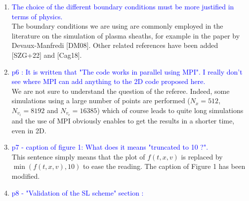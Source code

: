 \documentclass{article}
\begin{document}
\begin{enumerate}
    \item \textcolor{blue}{The choice of the different boundary conditions must be more justified in terms of physics. }\\
The boundary conditions we are using are commonly employed in the literature on the simulation of plasma sheaths, 
for example in the paper by Devaux-Manfredi [DM08]. Other related references have been added [SZG+22] and [Cag18].   \\%
    \item \textcolor{blue}{p6 : It is written that "The code works in parallel using MPI". I really don't see where MPI can add anything to the 2D code proposed here. }\\ 
    We are not sure to understand the question of the referee. Indeed, some simulations using a large number of points are performed 
    ($N_x=512$, $N_{v_i}=8192$ and $N_{v_e}=16385$) which of course leads to quite long simulations and the use of MPI obviously 
    enables to get the results in a shorter time, even in 2D. \\
    \item \textcolor{blue}{p7 - caption of figure 1: What does it means "truncated to 10 ?". }\\
    This sentence simply means that the plot of $f(t, x, v)$ is replaced by $\min(f(t, x, v), 10)$ to ease the reading. The caption of Figure 1 has been modified. \\
    \item \textcolor{blue}{p8 - "Validation of the SL scheme" section :}
\begin{enumerate}

\end{enumerate}
\end{enumerate}
\end{document}

